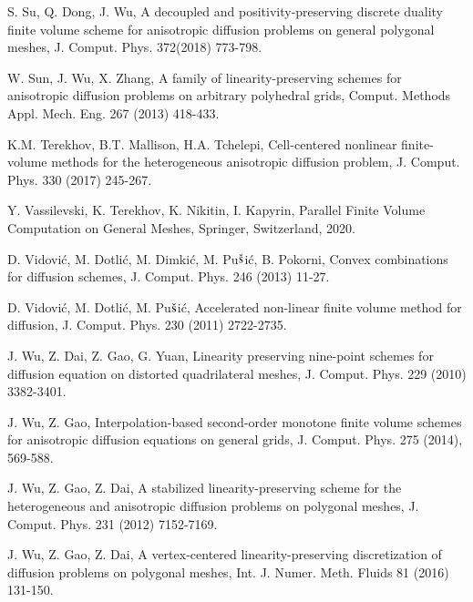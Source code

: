 \documentclass[times,review,preprint,authoryear]{elsarticle}
\begin{document}
\begin{thebibliography}{100}
S. Su, Q. Dong, J. Wu, A decoupled and positivity-preserving discrete duality finite volume scheme for anisotropic diffusion problems on general polygonal meshes, J. Comput. Phys. 372(2018) 773-798.



W. Sun, J. Wu, X. Zhang, A family of linearity-preserving schemes for anisotropic diffusion problems on arbitrary polyhedral grids, Comput. Methods Appl. Mech. Eng. 267 (2013) 418-433.



K.M. Terekhov, B.T. Mallison, H.A. Tchelepi, Cell-centered nonlinear finite-volume methods for the heterogeneous anisotropic diffusion problem, J. Comput. Phys. 330 (2017) 245-267.

{\color{black}
Y. Vassilevski, K. Terekhov, K. Nikitin, I. Kapyrin, Parallel Finite Volume Computation on General Meshes,  Springer, Switzerland, 2020.}



D. Vidovi{\color{black}\'c}, M. Dotli{\color{black}\'c}, M. Dimki{\color{black}\'c}, M. Pu{\color{black}$\check{\hbox{s}}$}i{\color{black}\'c}, B. Pokorni, Convex combinations for diffusion schemes, J. Comput. Phys. 246 (2013) 11-27.

D. Vidovi{\color{black}\'c}, M. Dotli{\color{black}\'c},  M. Pu{\color{black}$\check{\hbox{s}}$}i{\color{black}\'c},  Accelerated non-linear finite volume method for diffusion, J. Comput. Phys. 230 (2011) 2722-2735.




J. Wu, Z. Dai, Z. Gao, G. Yuan, Linearity preserving nine-point schemes for diffusion equation on distorted quadrilateral meshes, J. Comput.
Phys. 229 (2010) 3382-3401.


J. Wu, Z. Gao, Interpolation-based second-order monotone finite volume schemes for
anisotropic diffusion equations on general grids, J. Comput. Phys. 275 (2014), 569-588.


J. Wu, Z. Gao, Z. Dai, A stabilized linearity-preserving scheme for the heterogeneous and anisotropic diffusion problems on polygonal meshes, J. Comput. Phys. 231 (2012) 7152-7169.

J. Wu,  Z. Gao, Z. Dai, A vertex-centered linearity-preserving discretization of diffusion problems on polygonal meshes,  Int. J. Numer. Meth. Fluids 81 (2016) 131-150.



\end{thebibliography}
\end{document}

